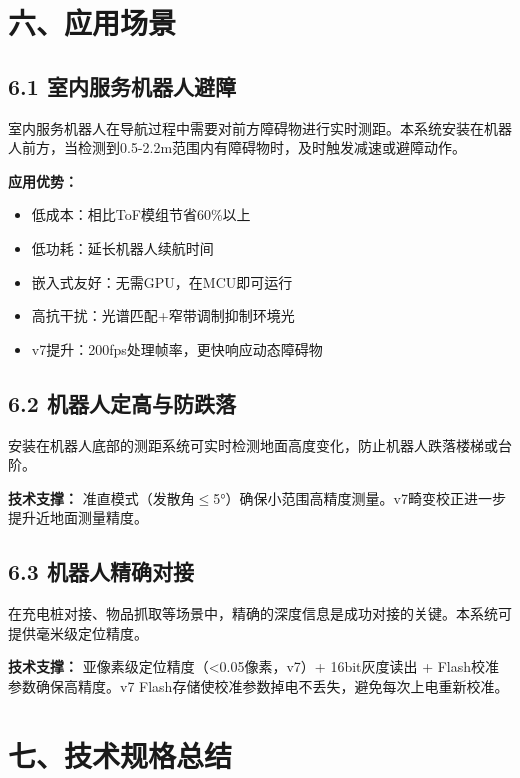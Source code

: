 \documentclass[12pt,a4paper]{article}
\begin{document}
\newpage

\section{六、应用场景}

\subsection{6.1 室内服务机器人避障}

室内服务机器人在导航过程中需要对前方障碍物进行实时测距。本系统安装在机器人前方，当检测到0.5-2.2m范围内有障碍物时，及时触发减速或避障动作。

\textbf{应用优势：}
\begin{itemize}
\item 低成本：相比ToF模组节省60\%以上
\item 低功耗：延长机器人续航时间
\item 嵌入式友好：无需GPU，在MCU即可运行
\item 高抗干扰：光谱匹配+窄带调制抑制环境光
\item v7提升：200fps处理帧率，更快响应动态障碍物
\end{itemize}

\subsection{6.2 机器人定高与防跌落}

安装在机器人底部的测距系统可实时检测地面高度变化，防止机器人跌落楼梯或台阶。

\textbf{技术支撑：} 准直模式（发散角$\le$5°）确保小范围高精度测量。v7畸变校正进一步提升近地面测量精度。

\subsection{6.3 机器人精确对接}

在充电桩对接、物品抓取等场景中，精确的深度信息是成功对接的关键。本系统可提供毫米级定位精度。

\textbf{技术支撑：} 亚像素级定位精度（<0.05像素，v7）+ 16bit灰度读出 + Flash校准参数确保高精度。v7 Flash存储使校准参数掉电不丢失，避免每次上电重新校准。

\newpage

\section{七、技术规格总结}
\end{document}
